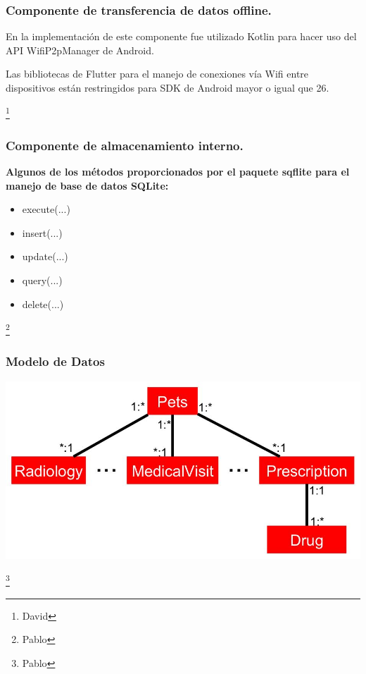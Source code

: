 \documentclass[14pt]{beamer}
\begin{document}
\begin{frame}
\frametitle{Componente de transferencia de datos offline.}

\begin{block}{}
En la implementación de este componente fue utilizado Kotlin para hacer uso del API WifiP2pManager de Android.

Las bibliotecas de Flutter para el manejo de conexiones vía Wifi entre dispositivos están restringidos para SDK de Android mayor o igual que 26.
\end{block}
\footnote{David}
\end{frame}

\begin{frame}
\frametitle{Componente de almacenamiento interno.}

\textbf{Algunos de los métodos proporcionados por el paquete sqflite para el manejo de base de datos SQLite:}

\begin{itemize}


\item execute(...)
\item insert(...)
\item update(...)
\item query(...)
\item delete(...)
\end{itemize}
\footnote{Pablo}
\end{frame}



\begin{frame}
\frametitle{Modelo de Datos}

\begin{center}

\includegraphics[scale =0.35]{Images/symplifiedClass.jpg}

\end{center}

\footnote{Pablo}
\end{frame}
\end{document}
